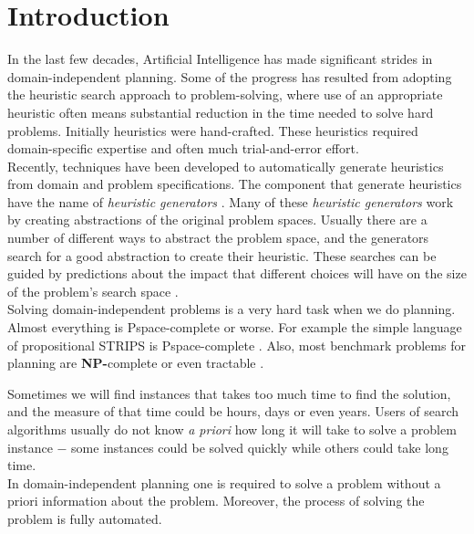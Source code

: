 \documentclass[a4paper,12pt]{article}
\begin{document}
\tableofcontents
\newpage

\section{Introduction}
In the last few decades, Artificial Intelligence has made significant strides in domain-independent planning. Some of the progress has resulted from adopting the heuristic search approach to problem-solving, where use of an appropriate heuristic often means substantial reduction in the time needed to solve hard problems. Initially heuristics were hand-crafted. These heuristics required domain-specific expertise and often much trial-and-error effort.\\

Recently, techniques \citep{haslum2007domain, edelkamp2007automated, nissim2011computing}  have been developed to automatically generate heuristics from domain and problem specifications. The component that generate heuristics have the name of \textit{heuristic generators} \citep{BarleySantiagoOver}.  Many of these \textit{heuristic generators} work by creating abstractions of the original problem spaces. Usually there are a number of different ways to abstract the problem space, and the generators search for a good abstraction to create their heuristic. These searches can be guided by predictions about the impact that different choices will have on the size of the problem's search space \citep{haslum2007domain}.\\

Solving domain-independent problems is a very hard task when we do planning. Almost everything is \textsf{Pspace-}complete or worse. For example the simple language of propositional \textsf{STRIPS} is \textsf{Pspace-}complete \citep{bylander1994computational}. Also, most benchmark problems for planning are \textbf{NP-}complete or even tractable \citep{helmert2006fast}.

Sometimes we will find instances that takes too much time to find the solution, and the measure of that time could be hours, days or even years. Users of search algorithms usually do not know \textit{a priori} how long it will take to solve a problem instance $-$ some instances could be solved quickly while others could take long time.\\

In domain-independent planning one is required to solve a problem without a priori information about the problem. Moreover, the process of solving the problem is fully automated.\\
\end{document}
